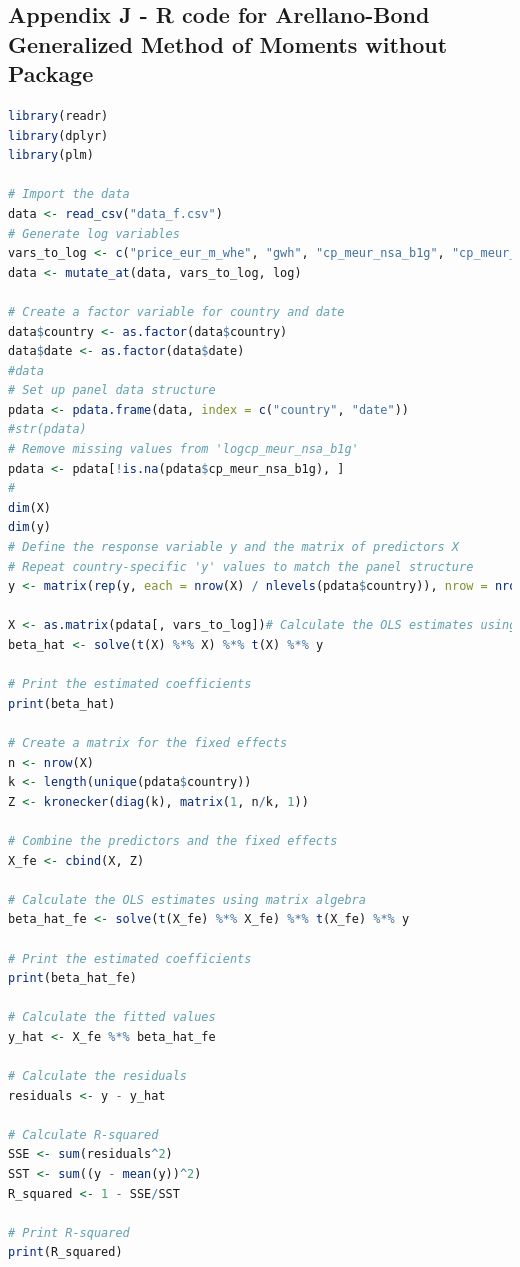 \documentclass[12pt]{article}
\begin{document}
\newpage
\subsection{Appendix J - R code for Arellano-Bond Generalized Method of Moments without Package}
\begin{lstlisting}[language=R]
library(readr)
library(dplyr)
library(plm)

# Import the data
data <- read_csv("data_f.csv")
# Generate log variables
vars_to_log <- c("price_eur_m_whe", "gwh", "cp_meur_nsa_b1g", "cp_meur_nsa_d1", "cp_meur_nsa_d11", "cp_meur_nsa_p6", "cp_meur_nsa_p7", "ths_hw_b_e_nsa_emp_dc", "ths_hw_c_nsa_emp_dc", "ths_hw_j_nsa_emp_dc", "ths_hw_g_i_nsa_emp_dc", "ths_hw_total_nsa_emp_dc", "exp_e7000_gwh")
data <- mutate_at(data, vars_to_log, log)

# Create a factor variable for country and date
data$country <- as.factor(data$country)
data$date <- as.factor(data$date)
#data 
# Set up panel data structure
pdata <- pdata.frame(data, index = c("country", "date"))
#str(pdata)
# Remove missing values from 'logcp_meur_nsa_b1g'
pdata <- pdata[!is.na(pdata$cp_meur_nsa_b1g), ]
#
dim(X)
dim(y)
# Define the response variable y and the matrix of predictors X
# Repeat country-specific 'y' values to match the panel structure
y <- matrix(rep(y, each = nrow(X) / nlevels(pdata$country)), nrow = nrow(X), ncol = ncol(y), byrow = TRUE)

X <- as.matrix(pdata[, vars_to_log])# Calculate the OLS estimates using matrix algebra
beta_hat <- solve(t(X) %*% X) %*% t(X) %*% y

# Print the estimated coefficients
print(beta_hat)

# Create a matrix for the fixed effects
n <- nrow(X)
k <- length(unique(pdata$country))
Z <- kronecker(diag(k), matrix(1, n/k, 1))

# Combine the predictors and the fixed effects
X_fe <- cbind(X, Z)

# Calculate the OLS estimates using matrix algebra
beta_hat_fe <- solve(t(X_fe) %*% X_fe) %*% t(X_fe) %*% y

# Print the estimated coefficients
print(beta_hat_fe)

# Calculate the fitted values
y_hat <- X_fe %*% beta_hat_fe

# Calculate the residuals
residuals <- y - y_hat

# Calculate R-squared
SSE <- sum(residuals^2)
SST <- sum((y - mean(y))^2)
R_squared <- 1 - SSE/SST

# Print R-squared
print(R_squared)


\end{lstlisting}
\end{document}
